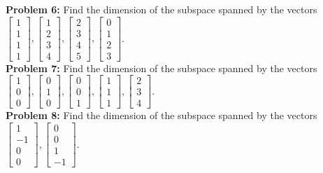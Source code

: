 \documentclass{article}
\begin{document}
\textbf{Problem 6:} Find the dimension of the subspace spanned by the vectors $\begin{bmatrix} 1 \\ 1 \\ 1 \\ 1 \end{bmatrix}, \begin{bmatrix} 1 \\ 2 \\ 3 \\ 4 \end{bmatrix}, \begin{bmatrix} 2 \\ 3 \\ 4 \\ 5 \end{bmatrix}, \begin{bmatrix} 0 \\ 1 \\ 2 \\ 3 \end{bmatrix}$. \\

\textbf{Problem 7:} Find the dimension of the subspace spanned by the vectors $\begin{bmatrix} 1 \\ 0 \\ 0 \end{bmatrix}, \begin{bmatrix} 0 \\ 1 \\ 0 \end{bmatrix}, \begin{bmatrix} 0 \\ 0 \\ 1 \end{bmatrix}, \begin{bmatrix} 1 \\ 1 \\ 1 \end{bmatrix}, \begin{bmatrix} 2 \\ 3 \\ 4 \end{bmatrix}$. \\

\textbf{Problem 8:} Find the dimension of the subspace spanned by the vectors $\begin{bmatrix} 1 \\ -1 \\ 0 \\ 0 \end{bmatrix}, \begin{bmatrix} 0 \\ 0 \\ 1 \\ -1 \end{bmatrix}$. \\
\end{document}
